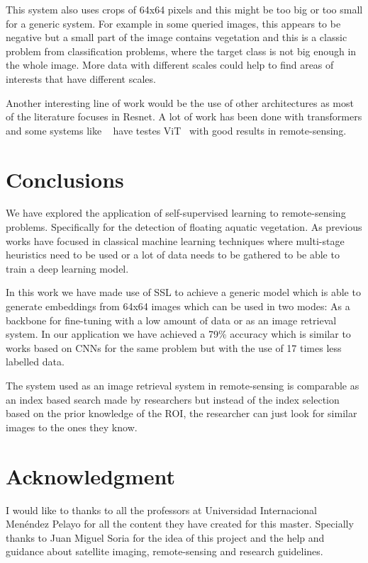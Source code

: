 \documentclass[conference]{IEEEtran}
\begin{document}
    This system also uses crops of 64x64 pixels and this might be too big or too small for a generic system.
    For example in some queried images, this appears to be negative but a small part of the image contains vegetation and this is a classic problem from classification problems,
    where the target class is not big enough in the whole image.
    More data with different scales could help to find areas of interests that have different scales.

    Another interesting line of work would be the use of other architectures as most of the literature focuses in Resnet.
    A lot of work has been done with transformers and some systems like ~\cite{wang2023ssl4eos12} have testes ViT~\cite{dosovitskiy2021image} with good results in remote-sensing.


    \section{Conclusions}

    We have explored the application of self-supervised learning to remote-sensing problems.
    Specifically for the detection of floating aquatic vegetation.
    As previous works have focused in classical machine learning techniques where multi-stage heuristics need to be used or a lot of data needs
    to be gathered to be able to train a deep learning model.

    In this work we have made use of SSL to achieve a generic model which is able to generate embeddings from 64x64 images which can be used in two modes:
    As a backbone for fine-tuning with a low amount of data or as an image retrieval system.
    In our application we have achieved a 79\% accuracy which is similar to works based on CNNs for the same problem but with the use of 17 times less labelled data.

    The system used as an image retrieval system in remote-sensing is comparable as an index based search made by researchers but instead of the index selection based
    on the prior knowledge of the ROI, the researcher can just look for similar images to the ones they know.

    \section*{Acknowledgment}
    I would like to thanks to all the professors at Universidad Internacional Menéndez Pelayo for all the content they have created for this master.
    Specially thanks to Juan Miguel Soria for the idea of this project and the help and guidance about satellite imaging, remote-sensing and research guidelines.
\end{document}
